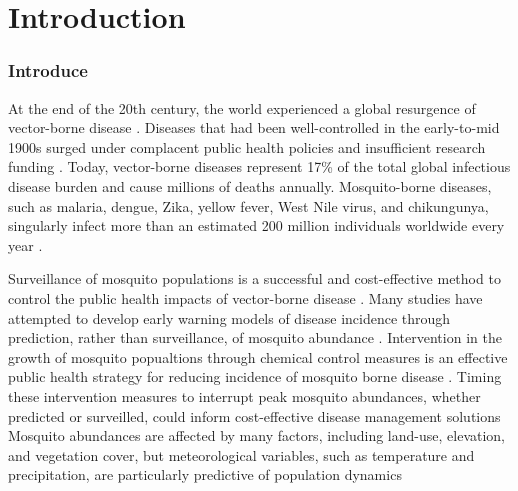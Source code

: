 \section{Introduction}
\setcounter{page}{1}

\subsubsection{Introduce}

At the end of the 20th century, the world experienced a global resurgence of vector-borne disease \citep{Gubler}. Diseases that had been well-controlled in the early-to-mid 1900s surged under complacent public health policies and insufficient research funding \citep{Gubler1998}. %
Today, vector-borne diseases represent 17\% of the total global infectious disease burden and cause millions of deaths annually. Mosquito-borne diseases, such as malaria, dengue, Zika, yellow fever, West Nile virus, and chikungunya, singularly infect more than an estimated 200 million individuals worldwide every year \citep{WHOreport}. 

Surveillance of mosquito populations is a successful and cost-effective method to control the public health impacts of vector-borne disease \citep{Vazquez-Prokopec2010}. Many studies have attempted to develop early warning models of disease incidence through prediction, rather than surveillance, of mosquito abundance \citep{Beck-Johnson2013, Li2019, Poh2019}. Intervention in the growth of mosquito popualtions through chemical control measures is an effective public health strategy for reducing incidence of mosquito borne disease \citep{Tomerini2011}. Timing these intervention measures to interrupt peak mosquito abundances, whether predicted or surveilled, could inform cost-effective disease management solutions 
Mosquito abundances are affected by many factors, including land-use, elevation, and vegetation cover, but meteorological variables, such as temperature and precipitation, are particularly predictive of population dynamics \citep{Yoo2016} 

